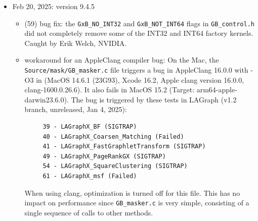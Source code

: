 \begin{itemize}
\begin{itemize}
    \item enum parameters: replaced all enum parameters with int, to simplify
        future updates to enum parameters, including the \verb'GrB_Field'.

    \item \verb'GxB_JIT_ERROR': added in 9.4.x, changed value to avoid conflict
        with LAGraph error codes.

    \item pack/unpack: these are declared historical; they still work but use
        64-bit integers only.  Use the new \verb'GxB_Container' methods
        instead.

    \item \verb'GxB_Matrix_iso' and \verb'GxB_Vector_iso': declared
        historical; use \verb'GrB_get' with the new \verb'GxB_ISO' enum.

    \item \verb'GxB_Matrix_type', \verb'GxB_Vector_type',
        \verb'GxB_Scalar_type': no longer historical;
        added back to the user guide.

    \item Summary: the API is upward-compatible with 9.4.x, but only after
        the user application is recompiled with GraphBLAS v10.0.0.
        As a result, the SO version must increase from 9 to 10.

    \end{itemize}

\item Feb 20, 2025: version 9.4.5

    \begin{itemize}
    \item (59) bug fix: the \verb'GxB_NO_INT32' and \verb'GxB_NOT_INT64' flags
        in \verb'GB_control.h' did not completely remove some of the INT32 and
        INT64 factory kernels.  Caught by Erik Welch, NVIDIA.

    \item workaround for an AppleClang compiler bug:  On the Mac, the
        \verb'Source/mask/GB_masker.c' file
        triggers a bug in AppleClang 16.0.0 with -O3 in (MacOS 14.6.1 (23G93),
        Xcode 16.2, Apple clang version 16.0.0, clang-1600.0.26.6).  It also
        fails in MacOS 15.2 (Target: arm64-apple-darwin23.6.0).  The bug is
        triggered by these tests in LAGraph (v1.2 branch, unreleased, Jan 4,
        2025):
        \begin{verbatim}
	 39 - LAGraphX_BF (SIGTRAP)
	 40 - LAGraphX_Coarsen_Matching (Failed)
	 41 - LAGraphX_FastGraphletTransform (SIGTRAP)
	 49 - LAGraphX_PageRankGX (SIGTRAP)
	 54 - LAGraphX_SquareClustering (SIGTRAP)
	 61 - LAGraphX_msf (Failed)
        \end{verbatim}
        When using clang, optimization is turned off for this file.  This has
        no impact on performance since \verb'GB_masker.c' is very simple,
        consisting of a single sequence of calls to other methods.
    \end{itemize}


\end{itemize}
